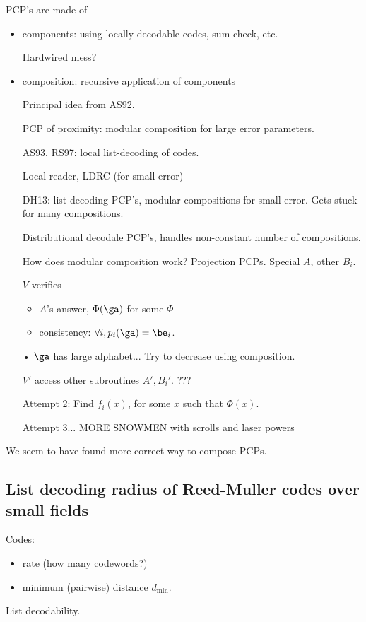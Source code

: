 PCP's are made of 
\begin{itemize}
\item
components: using locally-decodable codes, sum-check, etc.

Hardwired mess?
\item
composition: recursive application of components

Principal idea from AS92.

PCP of proximity: modular composition for large error parameters.

AS93, RS97: local list-decoding of codes.

Local-reader, LDRC (for small error)

DH13: list-decoding PCP's, modular compositions for small error. Gets stuck for many compositions.

Distributional decodale PCP's, handles non-constant number of compositions.

How does modular composition work? Projection PCPs. Special $A$, other $B_i$. 

$V$ verifies
\begin{itemize}
\item
$A$'s answer, $\Phi(\ga)$ for some $\Phi$
\item
consistency: $\forall i,p_i(\ga)=\be_i$.
\end{itemize}•
$\ga$ has large alphabet... Try to decrease using composition.

$V'$ access other subroutines $A',B_i'$. ???

Attempt 2: Find $f_i(x)$, for some $x$ such that $\Phi(x)$.

Attempt 3... MORE SNOWMEN with scrolls and laser powers
\end{itemize}
We seem to have found more correct way to compose PCPs. 


\subsection{List decoding radius of Reed-Muller codes over small fields}

Codes:
\begin{itemize}
\item
rate (how many codewords?)
\item
minimum (pairwise) distance $d_{\min}$.
\end{itemize}

List decodability.

